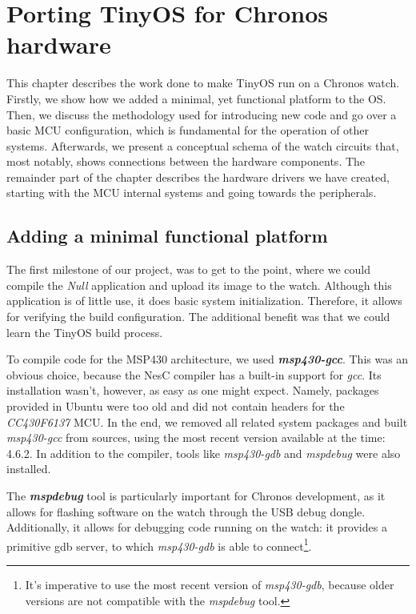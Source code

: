\chapter{Porting TinyOS for Chronos hardware}
\label{ch:porting}

This chapter describes the work done to make TinyOS run on a Chronos watch. Firstly, we show how we added a minimal, yet functional platform to the OS. Then, we discuss the methodology used for introducing new code and go over a basic MCU configuration, which is fundamental for the operation of other systems. Afterwards, we present a conceptual schema of the watch circuits that, most notably, shows connections between the hardware components. The remainder part of the chapter describes the hardware drivers we have created, starting with the MCU internal systems and going towards the peripherals.

\section{Adding a minimal functional platform}

The first milestone of our project, was to get to the point, where we could compile the \emph{Null} application and upload its image to the watch. Although this application is of little use, it does basic system initialization. Therefore, it allows for verifying the build configuration. The additional benefit was that we could learn the TinyOS build process.

To compile code for the MSP430 architecture, we used \emph{\bf msp430-gcc}. This was an obvious choice, because the NesC compiler has a built-in support for \emph{gcc}. Its installation wasn't, however, as easy as one might expect. Namely, packages provided in Ubuntu were too old and did not contain headers for the \emph{CC430F6137} MCU. In the end, we removed all related system packages and built \emph{msp430-gcc} from sources, using the most recent version available at the time: 4.6.2.  In addition to the compiler, tools like \emph{msp430-gdb} and \emph{mspdebug} were also installed.

The \emph{\bf mspdebug} tool is particularly important for Chronos development, as it allows for flashing software on the watch through the USB debug dongle.  Additionally, it allows for debugging code running on the watch: it provides a primitive gdb server, to which \emph{msp430-gdb} is able to connect\footnote{It's imperative to use the most recent version of \emph{msp430-gdb}, because older versions are not compatible with the \emph{mspdebug} tool.}.


